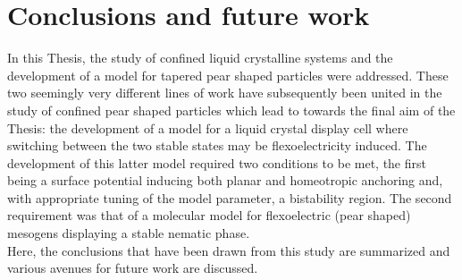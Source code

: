 \chapter{Conclusions and future work}



In this Thesis, the study of confined liquid crystalline systems and the development of a model 
for tapered pear shaped particles were addressed. These two seemingly
very different lines of work have subsequently been united in the study of confined pear shaped
particles which lead to towards the final aim of the Thesis: the development of a model for a 
liquid crystal display cell where switching between the two
stable states may be flexoelectricity induced. The development of this latter model required two 
conditions to be met, the first being a surface potential inducing both planar and homeotropic 
anchoring and, with  appropriate tuning of the model parameter, a bistability
region. The second requirement was that of a molecular model for flexoelectric (\ie pear shaped) 
mesogens displaying a stable nematic phase.\\
Here, the conclusions that have been drawn from this study are summarized and various avenues 
for future work are discussed.



